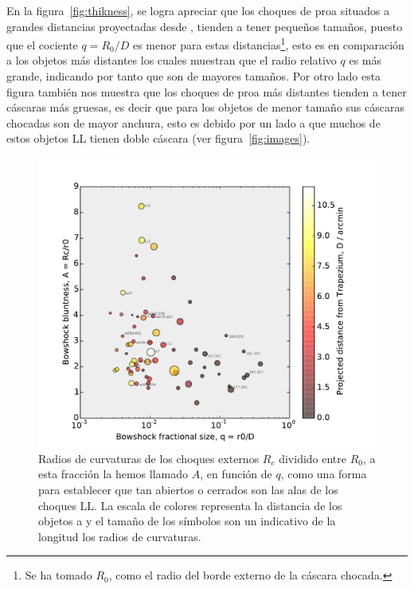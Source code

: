  En la figura~\ref{fig:thikness}, se logra apreciar que los choques de proa situados a grandes distancias  proyectadas desde \thC{}, tienden a tener  pequeños tamaños, puesto que el cociente \(q = R_{0}/D\) es menor para estas distancias\footnote{Se ha tomado \(R_{0}\), como el radio del borde externo de la cáscara chocada.}, esto es en comparación a los objetos más distantes los cuales muestran que el radio relativo \(q\) es más grande, indicando por tanto que son de mayores tamaños. Por otro lado esta figura también nos muestra que los choques de proa más distantes tienden a tener cáscaras más gruesas, es decir que para los objetos de menor tamaño sus cáscaras chocadas son de mayor anchura, esto es debido por un lado a que muchos de estos objetos LL tienen doble cáscara (ver figura~\ref{fig:images}).\\ 

\begin{figure}
  \centering
  \includegraphics[width=\linewidth]{luis-programas/will-A-vs-q}
  \caption{Radios de curvaturas de los choques externos \(R_{c}\) dividido entre \(R_{0}\), a esta fracción la hemos llamado \(A\), en función de \(q\), como una forma para establecer que tan abiertos o cerrados son las alas de los choques LL. La escala de colores representa la distancia de los objetos a \thC{} y el tamaño de los símbolos son un indicativo de la longitud los radios de curvaturas.}
  \label{fig:radii-curvatures}
\end{figure} 

